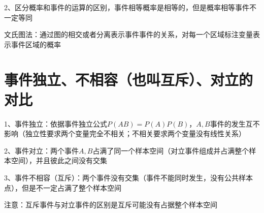 2、区分概率和事件的运算的区别，事件相等概率是相等的，但是概率相等事件不一定等同

文氏图法：通过图的相交或者分离表示事件事件的关系，对每一个区域标注变量表示事件区域的概率



\section{事件独立、不相容（也叫互斥）、对立的对比}

1、事件独立：依据事件独立公式$P(AB)=P(A)P(B)$，$A,B$事件的发生互不影响（独立性要求两个变量完全不相关；不相关要求两个变量没有线性关系）

2、事件对立：两个事件$A,B$占满了同一个样本空间（对立事件组成并占满整个样本空间），并且彼此之间没有交集

3、事件不相容（互斥）：两个事件没有交集（事件不能同时发生，没有公共样本点），但是不一定占满了整个样本空间

注意：互斥事件与对立事件的区别是互斥可能没有占据整个样本空间

